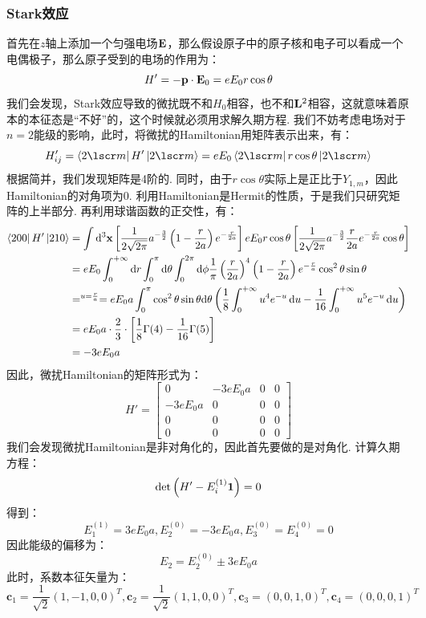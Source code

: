 \subsubsection{Stark效应}
首先在\(z\)轴上添加一个匀强电场\(\mathbf{E}\)，那么假设原子中的原子核和电子可以看成一个电偶极子，那么原子受到的电场的作用为：
\[
H' = -\mathbf{p}\cdot\mathbf{E}_{0} = eE_{0}r\cos\theta
\]
我们会发现，Stark效应导致的微扰既不和\(H_{0}\)相容，也不和\(\mathbf{L}^{2}\)相容，这就意味着原本的本征态是“不好”的，这个时候就必须用求解久期方程. 我们不妨考虑电场对于\(n=2\)能级的影响，此时，将微扰的Hamiltonian用矩阵表示出来，有：
\[
H'_{ij} = \bra{2\lscr m}H'\ket{2\lscr m} = eE_{0}\bra{2\lscr m}r\cos\theta\ket{2\lscr m}
\]
根据简并，我们发现矩阵是4阶的. 同时，由于\(r\cos\theta\)实际上是正比于\(Y_{1,m}\)，因此Hamiltonian的对角项为0. 利用Hamiltonian是Hermit的性质，于是我们只研究矩阵的上半部分. 再利用球谐函数的正交性，有：
\begin{align*}
\bra{200}H'\ket{210}
& = \int\dd^{3}\mathbf{x} \left[{\frac{1}{2\sqrt{2\pi}}a^{-\frac{3}{2}}\left({1-\frac{r}{2a}}\right)e^{-\frac{r}{2a}}}\right]eE_{0}r\cos\theta\left[{\frac{1}{2\sqrt{2\pi}}a^{-\frac{3}{2}}\frac{r}{2a}e^{-\frac{r}{2a}}\cos\theta}\right] \\
& = eE_{0}\int_{0}^{+\infty}\dd{r}\int_{0}^{\pi}\dd\theta\int_{0}^{2\pi}\dd\phi \frac{1}{\pi}\left({\frac{r}{2a}}\right)^{4}\left({1-\frac{r}{2a}}\right)e^{-\frac{r}{a}}\cos^{2}\theta\sin\theta \\
& =^{u=\frac{r}{a}}= eE_{0}a\int_{0}^{\pi}\cos^{2}\theta\sin\theta\dd\theta\left({\frac{1}{8}\int_{0}^{+\infty}u^{4}e^{-u}\dd{u} - \frac{1}{16}\int_{0}^{+\infty}u^{5}e^{-u}\dd{u}}\right) \\
& = eE_{0}a\cdot\frac{2}{3}\cdot\left[{\frac{1}{8}\Gamma(4) - \frac{1}{16}\Gamma(5)}\right] \\
& = -3eE_{0}a
\end{align*}
因此，微扰Hamiltonian的矩阵形式为：
\[
H' = 
\begin{bmatrix}
0 & -3eE_{0}a & 0 & 0 \\
-3eE_{0}a & 0 & 0 & 0 \\
0 & 0 & 0 & 0 \\
0 & 0 & 0 & 0 
\end{bmatrix}
\]
我们会发现微扰Hamiltonian是非对角化的，因此首先要做的是对角化. 计算久期方程：
\[
\det\left({H'-E_{i}^{(1)}\mathbf{1}}\right) = 0
\]
得到：
\[
E_{1}^{(1)} = 3eE_{0}a, E_{2}^{(0)} = -3eE_{0}a, E_{3}^{(0)} = E_{4}^{(0)} = 0
\]
因此能级的偏移为：
\[
E_{2} = E_{2}^{(0)} \pm 3eE_{0}a 
\]
此时，系数本征矢量为：
\[
\mathbf{c}_{1} = \frac{1}{\sqrt{2}}(1,-1,0,0)^{T},\mathbf{c}_{2} = \frac{1}{\sqrt{2}}(1,1,0,0)^{T},\mathbf{c}_{3} = (0,0,1,0)^{T}, \mathbf{c}_{4} = (0,0,0,1)^{T}
\]
